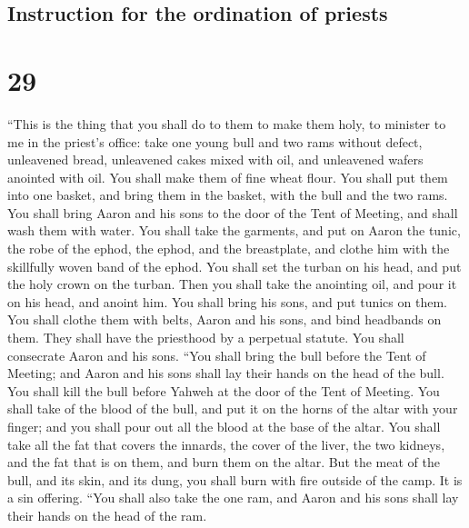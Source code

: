 \hypertarget{instruction-for-the-ordination-of-priests}{%
\subsection{Instruction for the ordination of
priests}\label{instruction-for-the-ordination-of-priests}}

\hypertarget{section-28}{%
\section{29}\label{section-28}}

 ``This is the thing that you shall do to them to make
them holy, to minister to me in the priest's office: take one young bull
and two rams without defect,  unleavened bread, unleavened
cakes mixed with oil, and unleavened wafers anointed with oil. You shall
make them of fine wheat flour.  You shall put them into
one basket, and bring them in the basket, with the bull and the two
rams.  You shall bring Aaron and his sons to the door of
the Tent of Meeting, and shall wash them with water.  You
shall take the garments, and put on Aaron the tunic, the robe of the
ephod, the ephod, and the breastplate, and clothe him with the
skillfully woven band of the ephod.  You shall set the
turban on his head, and put the holy crown on the turban. 
Then you shall take the anointing oil, and pour it on his head, and
anoint him.  You shall bring his sons, and put tunics on
them.  You shall clothe them with belts, Aaron and his
sons, and bind headbands on them. They shall have the priesthood by a
perpetual statute. You shall consecrate Aaron and his sons.
 ``You shall bring the bull before the Tent of Meeting;
and Aaron and his sons shall lay their hands on the head of the bull.
 You shall kill the bull before Yahweh at the door of the
Tent of Meeting.  You shall take of the blood of the
bull, and put it on the horns of the altar with your finger; and you
shall pour out all the blood at the base of the altar. 
You shall take all the fat that covers the innards, the cover of the
liver, the two kidneys, and the fat that is on them, and burn them on
the altar.  But the meat of the bull, and its skin, and
its dung, you shall burn with fire outside of the camp. It is a sin
offering.  ``You shall also take the one ram, and Aaron
and his sons shall lay their hands on the head of the ram.
